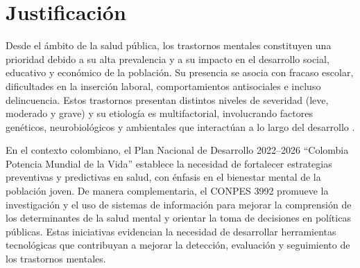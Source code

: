 \section{Justificación}

Desde el ámbito de la salud pública, los trastornos mentales constituyen una prioridad debido a su alta prevalencia y a su impacto en el desarrollo social, educativo y económico de la población. Su presencia se asocia con fracaso escolar, dificultades en la inserción laboral, comportamientos antisociales e incluso delincuencia. Estos trastornos presentan distintos niveles de severidad (leve, moderado y grave) y su etiología es multifactorial, involucrando factores genéticos, neurobiológicos y ambientales que interactúan a lo largo del desarrollo \cite{Saxena2013}. 

En el contexto colombiano, el Plan Nacional de Desarrollo 2022–2026 “Colombia Potencia Mundial de la Vida” establece la necesidad de fortalecer estrategias preventivas y predictivas en salud, con énfasis en el bienestar mental de la población joven. De manera complementaria, el CONPES 3992 promueve la investigación y el uso de sistemas de información para mejorar la comprensión de los determinantes de la salud mental y orientar la toma de decisiones en políticas públicas. Estas iniciativas evidencian la necesidad de desarrollar herramientas tecnológicas que contribuyan a mejorar la detección, evaluación y seguimiento de los trastornos mentales.




